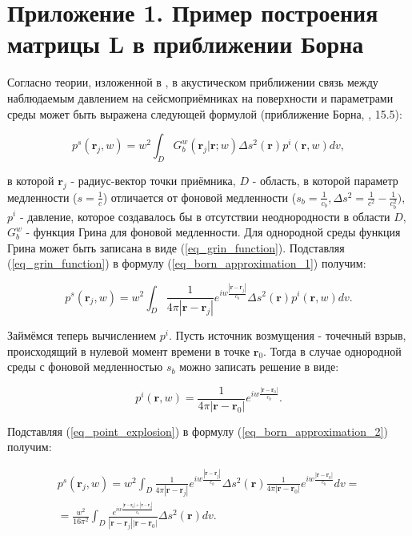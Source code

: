 \documentclass{article}
\renewcommand{\vec     } [1]     { \bm{#1}           }
\begin{document}
\section{Приложение 1. Пример построения матрицы L в приближении Борна}

Согласно теории, изложенной в \cite{Zhdanov_2007}, в акустическом приближении связь между наблюдаемым давлением на
сейсмоприёмниках на поверхности и параметрами среды может быть выражена следующей формулой (приближение Борна, \cite{Zhdanov_2007}, 15.5):

\begin{equation}
\label{eq_born_approximation_1}
p^s(\vec{r}_j, w) = w^2\int_D G^w_b(\vec{r}_j|\vec{r};w)\Delta s^2(\vec{r})p^i(\vec{r},w)  dv,
\end{equation}

в которой $\vec{r}_j$ - радиус-вектор точки приёмника, $D$ - область, в которой параметр медленности ($s = \frac{1}{c}$)
отличается от фоновой медленности ($s_b = \frac{1}{c_b},\Delta s^2 = \frac{1}{c^2} - \frac{1}{c^2_b})$, $p^i$ - давление, которое создавалось бы
в отсутствии неоднородности в области $D$, $G^w_b$ - функция Грина для фоновой медленности.
Для однородной среды функция Грина может быть записана в виде (\ref{eq_grin_function}).
Подставляя (\ref{eq_grin_function}) в формулу (\ref{eq_born_approximation_1}) получим:

\begin{equation}
\label{eq_born_approximation_2}
p^s(\vec{r}_j, w) = w^2\int_D \frac{1}{4\pi|\vec{r}-\vec{r}_j|}e^{iw\frac{|\vec{r}-\vec{r}_j|}{c_b}} \Delta s^2(\vec{r})p^i(\vec{r},w)  dv.
\end{equation}

Займёмся теперь вычислением $p^i$.
Пусть источник возмущения - точечный взрыв, происходящий в нулевой момент времени в точке $\vec{r}_0$.
Тогда в случае однородной среды с фоновой медленностью $s_b$ можно записать решение в виде:

\begin{equation}
\label{eq_point_explosion}
p^i(\vec{r}, w) = \frac{1}{4\pi|\vec{r}-\vec{r}_0|}e^{iw\frac{|\vec{r}-\vec{r}_0|}{c_b}}.
\end{equation}

Подставляя (\ref{eq_point_explosion}) в формулу (\ref{eq_born_approximation_2}) получим:

\begin{eqnarray}
\label{eq_born_approximation_3}
p^s(\vec{r}_j, w) = w^2\int_D \frac{1}{4\pi|\vec{r}-\vec{r}_j|}e^{iw\frac{|\vec{r}-\vec{r}_j|}{c_b}} \Delta s^2(\vec{r})\frac{1}{4\pi|\vec{r}-\vec{r}_0|}e^{iw\frac{|\vec{r}-\vec{r}_0|}{c_b}}  dv = \nonumber \\
= \frac{w^2}{16\pi^2} \int_D \frac{e^{iw\frac{|\vec{r}-\vec{r}_0| + |\vec{r}-\vec{r}_j|}{c_b}}}{|\vec{r}-\vec{r}_j||\vec{r}-\vec{r}_0|} \Delta s^2(\vec{r}) dv.
\end{eqnarray}
\end{document}
